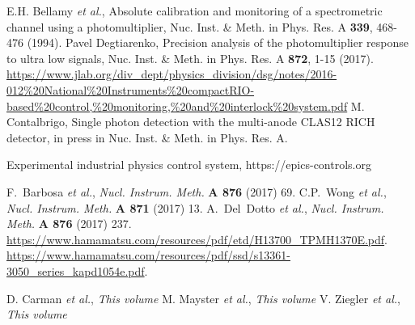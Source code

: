 \documentclass[5p,times,twocolumn]{elsarticle}
\def\etal{{\it et al.}}
\begin{document}
\begin{thebibliography}{00}
 E.H. Bellamy  \etal, Absolute calibration and monitoring of a spectrometric channel using a photomultiplier, Nuc. Inst. \& Meth. in Phys. Res. A \textbf{339}, 468-476 (1994).
 Pavel Degtiarenko, Precision analysis of the photomultiplier response to ultra low signals, Nuc. Inst. \& Meth. in Phys. Res. A \textbf{872}, 1-15  (2017).
 \url{https://www.jlab.org/div_dept/physics_division/dsg/notes/2016-012%20National%20Instruments%20compactRIO-based%20control,%20monitoring,%20and%20interlock%20system.pdf}
 M. Contalbrigo, Single photon detection with the multi-anode CLAS12 RICH detector, in press in Nuc. Inst. \& Meth. in Phys. Res. A.


 Experimental industrial physics control system, https://epics-controls.org


 F.~Barbosa \etal, {\em Nucl. Instrum. Meth.} {\bf A 876} (2017) 69.
 C.P.~Wong \etal, {\em Nucl. Instrum. Meth.} {\bf A 871} (2017) 13.
 A.~Del~Dotto \etal, {\em Nucl. Instrum. Meth.} {\bf A 876} (2017) 237.
 \url{https://www.hamamatsu.com/resources/pdf/etd/H13700\_TPMH1370E.pdf}.
 \url{https://www.hamamatsu.com/resources/pdf/ssd/s13361-3050\_series\_kapd1054e.pdf}.

 D. Carman \etal, {\em This volume}
 M. Mayster \etal, {\em This volume}
 V. Ziegler  \etal, {\em This volume}


\end{thebibliography}
\end{document}
